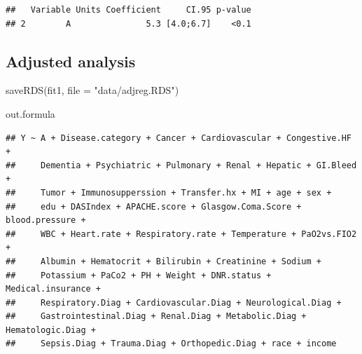 \documentclass[
]{book}
\newenvironment{Shaded}{\begin{snugshade}}{\end{snugshade}}
\newcommand{\AttributeTok}[1]{\textcolor[rgb]{0.77,0.63,0.00}{#1}}
\newcommand{\CommentTok}[1]{\textcolor[rgb]{0.56,0.35,0.01}{\textit{#1}}}
\newcommand{\DecValTok}[1]{\textcolor[rgb]{0.00,0.00,0.81}{#1}}
\newcommand{\FunctionTok}[1]{\textcolor[rgb]{0.00,0.00,0.00}{#1}}
\newcommand{\NormalTok}[1]{#1}
\newcommand{\OtherTok}[1]{\textcolor[rgb]{0.56,0.35,0.01}{#1}}
\newcommand{\SpecialCharTok}[1]{\textcolor[rgb]{0.00,0.00,0.00}{#1}}
\newcommand{\StringTok}[1]{\textcolor[rgb]{0.31,0.60,0.02}{#1}}
\begin{document}
\begin{verbatim}
##   Variable Units Coefficient     CI.95 p-value
## 2        A               5.3 [4.0;6.7]    <0.1
\end{verbatim}

\hypertarget{adjusted-analysis}{%
\subsection{Adjusted analysis}\label{adjusted-analysis}}

\begin{Shaded}
\end{Shaded}

\begin{Shaded}
\begin{Highlighting}[]
\FunctionTok{saveRDS}\NormalTok{(fit1, }\AttributeTok{file =} \StringTok{"data/adjreg.RDS"}\NormalTok{)}
\end{Highlighting}
\end{Shaded}

\begin{Shaded}
\begin{Highlighting}[]
\NormalTok{out.formula}
\end{Highlighting}
\end{Shaded}

\begin{verbatim}
## Y ~ A + Disease.category + Cancer + Cardiovascular + Congestive.HF + 
##     Dementia + Psychiatric + Pulmonary + Renal + Hepatic + GI.Bleed + 
##     Tumor + Immunosupperssion + Transfer.hx + MI + age + sex + 
##     edu + DASIndex + APACHE.score + Glasgow.Coma.Score + blood.pressure + 
##     WBC + Heart.rate + Respiratory.rate + Temperature + PaO2vs.FIO2 + 
##     Albumin + Hematocrit + Bilirubin + Creatinine + Sodium + 
##     Potassium + PaCo2 + PH + Weight + DNR.status + Medical.insurance + 
##     Respiratory.Diag + Cardiovascular.Diag + Neurological.Diag + 
##     Gastrointestinal.Diag + Renal.Diag + Metabolic.Diag + Hematologic.Diag + 
##     Sepsis.Diag + Trauma.Diag + Orthopedic.Diag + race + income
\end{verbatim}
\end{document}
